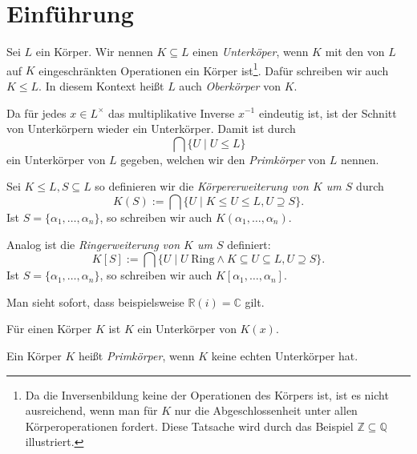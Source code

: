 \section{Einführung}

\begin{definition}\label{def:unterkoerper}
    Sei $L$ ein Körper. Wir nennen $K \subseteq L$ einen \emph{Unterköper}, wenn $K$ mit den von $L$ auf $K$ eingeschränkten Operationen ein Körper ist\footnote{Da die Inversenbildung keine der Operationen des Körpers ist, ist es nicht ausreichend, wenn man für $K$ nur die Abgeschlossenheit unter allen Körperoperationen fordert. Diese Tatsache wird durch das Beispiel $\mathbb{Z}\subseteq \mathbb{Q}$ illustriert.}. Dafür schreiben wir auch $K \leq L$. In diesem Kontext heißt $L$ auch \emph{Oberkörper} von $K$.

    Da für jedes $x\in L^\times$ das multiplikative Inverse $x^{-1}$ eindeutig ist, ist der Schnitt von Unterkörpern wieder ein Unterkörper. Damit ist durch
    $$ \bigcap \{ U \mid U\le L \} $$
    ein Unterkörper von $L$ gegeben, welchen wir den \emph{Primkörper} von $L$ nennen.

    Sei $K \leq L, S \subseteq L$ so definieren wir die \emph{Körpererweiterung von $K$ um $S$} durch
    $$ K(S) := \bigcap \{ U \mid K \leq U \leq L, U \supseteq S \}. $$
    Ist $S = \{ \alpha_1, \hdots, \alpha_n \}$, so schreiben wir auch $K(\alpha_1, \hdots, \alpha_n)$.
    
    Analog ist die \emph{Ringerweiterung von $K$ um $S$} definiert:
    $$ K[S] := \bigcap \{ U \mid U \;\mathrm{Ring}\land K \subseteq U \subseteq L, U \supseteq S \}. $$
    Ist $S = \{ \alpha_1, \hdots, \alpha_n \}$, so schreiben wir auch $K[\alpha_1, \hdots, \alpha_n]$.
\end{definition}

\begin{remark}
    Man sieht sofort, dass beispielsweise $\mathbb{R}(i) = \mathbb{C}$ gilt.
\end{remark}

\begin{remark}
    Für einen Körper $K$ ist $K$ ein Unterkörper von $K(x)$.
\end{remark}

\begin{definition}
    Ein Körper $K$ heißt \emph{Primkörper}, wenn $K$ keine echten Unterkörper hat.
\end{definition}

